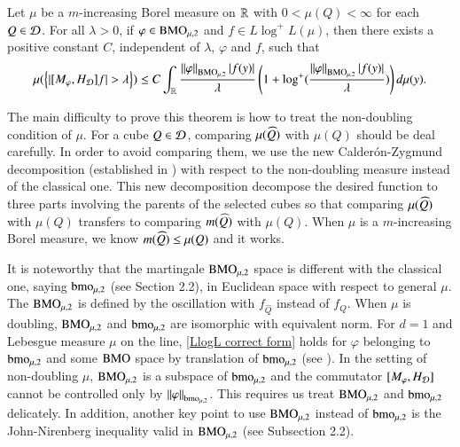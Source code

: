 \documentclass[leqno]{amsart}
\begin{document}
\begin{theorem}\label{endpoint estimate}
Let $\mu$ be a $m$-increasing Borel measure on ${\mathbb R}$ with $0<\mu(Q)<\infty$ for each $Q\in{\mathcal D}$.  For all $\lambda>0$, if $\varphi\in{\rm BMO}_{\mu,2}$ and $f\in L\log^{+}L(\mu)$, then there exists a positive constant $C$, independent of $\lambda$, $\varphi$ and $f$, such that
\begin{align*}
\mu(\set{|[M_{\varphi},H_{\D}]f|>\lambda})\leq C
\int_{\RR}\frac{\Norm{\varphi}_{\BMO_{\mu,2}}|f(y)|}{\lambda}\left(1+\log^{+}(\frac{\Norm{\varphi}_{\BMO_{\mu,2}}|f(y)|}{\lambda})\right)d\mu(y).
\end{align*}
\end{theorem}
The main difficulty to prove this theorem is how to treat the non-doubling condition of $\mu$. For a cube $Q\in{\mathcal D}$, comparing $\mu(\widehat{Q})$ with $\mu(Q)$ should be deal carefully. In order to avoid comparing them, we use the new Calder\'{o}n-Zygmund decomposition (established in \cite{LMP2014}) with respect to the non-doubling measure instead of the classical one. 
This new decomposition decompose the desired function to three parts involving the parents of the selected cubes so that comparing $\mu(\widehat{Q})$ with $\mu(Q)$ transfers to comparing $m(\widehat{Q})$ with $\mu(Q)$. When $\mu$ is a $m$-increasing Borel measure, we know $m(\widehat{Q})\leq\mu(Q)$ and it works. 

 

It is noteworthy that the martingale ${\rm BMO}_{\mu,2}$ space is different with the classical one, saying ${\rm bmo}_{\mu,2}$ (see Section 2.2), in Euclidean space with respect to general $\mu$. The ${\rm BMO}_{\mu,2}$ is defined by the oscillation with $f_{\widehat{Q}}$ instead of $f_{Q}$. When $\mu$ is doubling, ${\rm BMO}_{\mu,2}$ and ${\rm bmo}_{\mu,2}$ are isomorphic with equivalent norm.  For $d=1$ and Lebesgue measure $\mu$ on the line, \eqref{LlogL correct form} holds for $\varphi$ belonging to ${\rm bmo}_{\mu,2}$ and some ${\rm BMO}$ space by translation of ${\rm bmo}_{\mu,2}$ (see \cite{Me2003}).
In the setting of non-doubling $\mu$, ${\rm BMO}_{\mu,2}$ is a subspace of ${\rm bmo}_{\mu,2}$ and the commutator $[M_{\varphi},H_{{\mathcal D}}]$ cannot be controlled only by $\left\| \varphi \right\|_{{\rm bmo}_{\mu,2}}$. This requires us treat ${\rm BMO}_{\mu,2}$ and ${\rm bmo}_{\mu,2}$ delicately. In addition, another key point to use ${\rm BMO}_{\mu,2}$ instead of ${\rm bmo}_{\mu,2}$ is the John-Nirenberg inequality valid in ${\rm BMO}_{\mu,2}$ (see Subsection 2.2).
\end{document}
